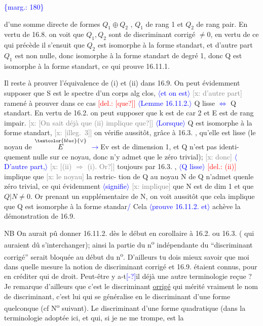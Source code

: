 \documentclass[11pt]{article}
\newcommand{\scanpage}[1]{\par\bigskip\noindent{\small\sffamily[scan #1]}\par}
\newcommand{\mspage}[1]{{\small\sffamily[p.\,#1]}}
\newcommand{\hand}[1]{\textcolor{blue}{#1}}
\let\over\relax
\newcommand{\over}[2]{\textcolor{gray}{#1}\textcolor{blue}{\ensuremath{^{\!\nearrow}}#2}}
\newcommand{\inserted}[2][]{\textcolor{blue}{$\langle$#2$\rangle$}}
\newcommand{\margin}[1]{\textcolor{blue}{\{\textsf{marg.:} #1\}}}
\newcommand{\deleted}[1]{\textcolor{red}{[\textsf{del.:} #1]}}
\newcommand{\xout}[1]{\textcolor{gray}{[\textsf{x:} #1]}}
\newcommand{\uline}[1]{\underline{#1}}
\newcommand{\unsure}[1]{[#1?]}
\newcommand{\illegible}[1]{[\textsf{illeg.\ #1}]}
\begin{document}
\margin{180}

\clearpage
\scanpage{25/181}
\mspage{8}

d'une somme directe de formes $Q_1 \oplus Q_2$ , $Q_1$ de rang 1 et $Q_2$ de rang pair.
En vertu de 16.8. on voit que $Q_1,Q_2$ sont de discriminant corrigé
$\neq 0$, en vertu de ce qui précède il s'ensuit que $Q_2$ est isomorphe à la
forme standart, et d'autre part $Q_1$ est non nulle, donc isomorphe à la
forme standart de degré 1, donc Q est isomorphe à la forme standart, ce
qui prouve 16.11.1.

Il reste à prouver l'équivalence de (i) et (ii) dans 16.9. On peut
évidemment supposer que S est le spectre d'un corps alg clos, \inserted[typed]{et on est} \xout{d'autre part}
ramené à prouver dans ce cas \deleted{\unsure{que}} \inserted[typed]{Lemme 16.11.2.} Q lisse \hand{$\Longleftrightarrow$} Q standart.
En vertu de 16.2. on peut supposer que k est de car 2 et E est de rang
impair. \xout{\unsure{On sait déjà que (ii) implique que}} \inserted[typed]{Lorsque} Q est isomorphe à la forme
standart, \xout{\illegible{3}} on vérifie aussitôt, grâce à 16.3. , qu'elle
est lisse (le noyau de $\overset{\hand{\vee}}{E}$ \hand{$\longrightarrow$}Ev est de dimension 1, et Q n'est pas identi-%
quement nulle sur ce noyau, donc n'y admet que le zéro trivial); \xout{donc}
\inserted{D'autre part,} \xout{\unsure{(ii) $\Rightarrow$ (i). Or}} toujours par 16.3. , \inserted{Q lisse} \deleted{(ii)} implique que \xout{le noyau} la restric-%
tion de Q au noyau N de Q n'admet quenle zéro trivial, ce qui évidemment
\inserted{signifie} \xout{implique} que N est de dim 1 et que $Q|N \neq 0$. Or prenant un supplémentaire
de N, on voit aussitôt que cela implique que Q est isomorphe à la forme
standar\over{t}{d}\hand{/} Cela \inserted[typed]{prouve 16.11.2. et} achève la démonstration de 16.9.

NB On aurait pû donner 16.11.2. dès le début en corollaire à
16.2. ou 16.3. ( qui auraient dû s'interchanger); ainsi la partie du n\textsuperscript{o}
indépendante du ``discriminant corrigé'' serait bloquée au début du n\textsuperscript{o}.
D'ailleurs tu dois mieux savoir que moi dans quelle mesure la notion
de discriminant corrigé et 16.9. étaient connus, pour en créditer qui de
droit. Peut-être y a-t\hand{\unsure{-}}il déjà une autre terminologie reçue ? Je remarque
d'ailleurs que c'est le discriminant \uline{\over{n}{c}orrigé} qui mérité vraiment le nom
de discriminant, c'est lui qui se généralise en le discriminant d'une
forme quelconque (cf N\textsuperscript{o} suivant). Le discriminant d'une forme quadratique
(dans la terminologie adoptée ici, et qui, si je ne me trompe, est la
\end{document}

